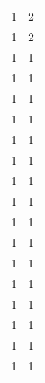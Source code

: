 \begin{tabular}{rr}
                  1 &             2 \\
                  1 &             2 \\
                  1 &             1 \\
                  1 &             1 \\
                  1 &             1 \\
                  1 &             1 \\
                  1 &             1 \\
                  1 &             1 \\
                  1 &             1 \\
                  1 &             1 \\
                  1 &             1 \\
                  1 &             1 \\
                  1 &             1 \\
                  1 &             1 \\
                  1 &             1 \\
                  1 &             1 \\
                  1 &             1 \\
                  1 &             1 \\
\bottomrule
\end{tabular}
